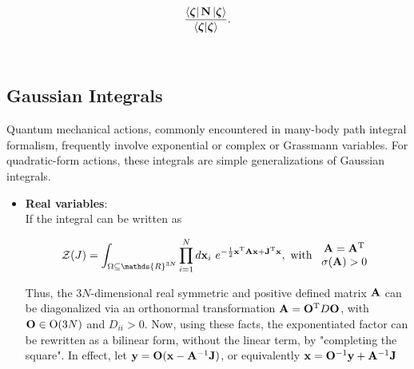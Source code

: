 \documentclass{homework}
\begin{document}
$$
\frac{\bra{\bm{\zeta}} {{\bf N}} \ket{\bm{\zeta}}}{\bra{\bm{\zeta}} \ket{\bm{\zeta}}}. 
$$

\blanky \\

\subsection{Gaussian Integrals}
 
Quantum mechanical actions, commonly encountered in many-body path integral formalism, frequently involve exponential or complex or Grassmann variables. For quadratic-form actions, these integrals are simple generalizations of Gaussian integrals. 

\begin{itemize}
    \item \textbf{Real variables}: \\
    
    If the integral can be written as 
    
    \begin{equation}
        \mathcal{Z}(J) = \int_{\Omega \subseteq \mathds{R}^{3N}} \prod_{i=1}^{N} d{{\bf x}}_i \blanky e^{-\frac{1}{2} {{\bf x}}^{\textnormal{T}} {{\bf A}} {{\bf x}} + {{\bf J}}^{\textnormal{T}} {{\bf x}}}, \textnormal{ with } \begin{array}{c}
            {{\bf A}} = {{\bf A}}^{\textnormal{T}} \\
            \sigma({{\bf A}}) > 0 
        \end{array}
    \end{equation}

Thus, the $3N$-dimensional real symmetric and positive defined matrix ${{{\bf A}}}$ can be diagonalized via an orthonormal transformation ${{\bf A}} = {{\bf O}}^{\textnormal{T}} D  {{\bf O}}$, with $ {{\bf O}} \in \textnormal{O}(3N)$ and $D_{ii} > 0$. Now, using these facts, the exponentiated factor can be rewritten as a bilinear form, without the linear term, by "completing the square". In effect, let ${{\bf y}} = {{\bf O} ({\bf x} - {\bf A}^{-1} {\bf J})}$, or equivalently ${\bf x} = {\bf O}^{-1} {\bf y} + {\bf A}^{-1} {\bf J}$


\end{itemize}
\end{document}
